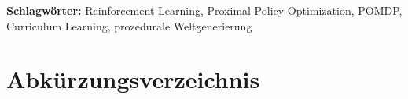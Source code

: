 \documentclass[
  a4paper,
  11pt,
  twoside,
  BCOR=8mm,           %
  headings=big,
  numbers=noenddot,
  listof=totoc,       %
  captions=tableheading,
]{scrreprt}
\begin{document}
\bigskip
\noindent\textbf{Schlagwörter:} Reinforcement Learning, Proximal Policy
Optimization, POMDP, Curriculum Learning, prozedurale Weltgenerierung

\clearpage


\tableofcontents
\listoffigures
\listoftables
\lstlistoflistings

\chapter*{Abkürzungsverzeichnis}
\thispagestyle{empty}
\end{document}
